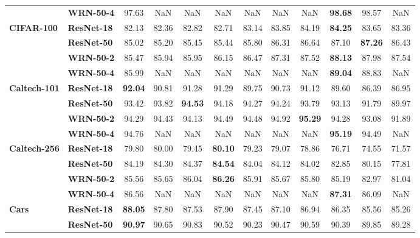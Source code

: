 \begin{table}
\begin{tabular}{l|l|cccccccccc}
       & \textbf{WRN-50-4} &             97.63 &   NaN &   NaN &   NaN &   NaN &   NaN &   NaN & \textbf{98.68} & 98.57 &   NaN \\
\cline{1-12}
\multirow{4}{*}{\textbf{CIFAR-100}} & \textbf{ResNet-18} &             82.13 & 82.36 & 82.82 & 82.71 & 83.14 & 83.85 & 84.19 & \textbf{84.25} & 83.65 & 83.36 \\
       & \textbf{ResNet-50} &             85.02 & 85.20 & 85.45 & 85.44 & 85.80 & 86.31 & 86.64 & 87.10 & \textbf{87.26} & 86.43 \\
       & \textbf{WRN-50-2} &             85.47 & 85.94 & 85.95 & 86.15 & 86.47 & 87.31 & 87.52 & \textbf{88.13} & 87.98 & 87.54 \\
       & \textbf{WRN-50-4} &             85.99 &   NaN &   NaN &   NaN &   NaN &   NaN &   NaN & \textbf{89.04} & 88.83 &   NaN \\
\cline{1-12}
\multirow{4}{*}{\textbf{Caltech-101}} & \textbf{ResNet-18} &             \textbf{92.04} & 90.81 & 91.28 & 91.29 & 89.75 & 90.73 & 91.12 & 89.60 & 86.39 & 86.95 \\
       & \textbf{ResNet-50} &             93.42 & 93.82 & \textbf{94.53} & 94.18 & 94.27 & 94.24 & 93.79 & 93.13 & 91.79 & 89.97 \\
       & \textbf{WRN-50-2} &             94.29 & 94.43 & 94.13 & 94.49 & 94.48 & 94.92 & \textbf{95.29} & 94.28 & 93.08 & 91.89 \\
       & \textbf{WRN-50-4} &             94.76 &   NaN &   NaN &   NaN &   NaN &   NaN &   NaN & \textbf{95.19} & 94.49 &   NaN \\
\cline{1-12}
\multirow{4}{*}{\textbf{Caltech-256}} & \textbf{ResNet-18} &             79.80 & 80.00 & 79.45 & \textbf{80.10} & 79.23 & 79.07 & 78.86 & 76.71 & 74.55 & 71.57 \\
       & \textbf{ResNet-50} &             84.19 & 84.30 & 84.37 & \textbf{84.54} & 84.04 & 84.12 & 84.02 & 82.85 & 80.15 & 77.81 \\
       & \textbf{WRN-50-2} &             85.56 & 85.65 & 86.04 & \textbf{86.26} & 85.91 & 85.67 & 85.80 & 85.19 & 82.97 & 81.04 \\
       & \textbf{WRN-50-4} &             86.56 &   NaN &   NaN &   NaN &   NaN &   NaN &   NaN & \textbf{87.31} & 86.09 &   NaN \\
\cline{1-12}
\multirow{4}{*}{\textbf{Cars}} & \textbf{ResNet-18} &             \textbf{88.05} & 87.80 & 87.53 & 87.90 & 87.45 & 87.10 & 86.94 & 86.35 & 85.56 & 85.26 \\
       & \textbf{ResNet-50} &             \textbf{90.97} & 90.65 & 90.83 & 90.52 & 90.23 & 90.47 & 90.59 & 90.39 & 89.85 & 89.28 \\

\end{tabular}
\end{table}
